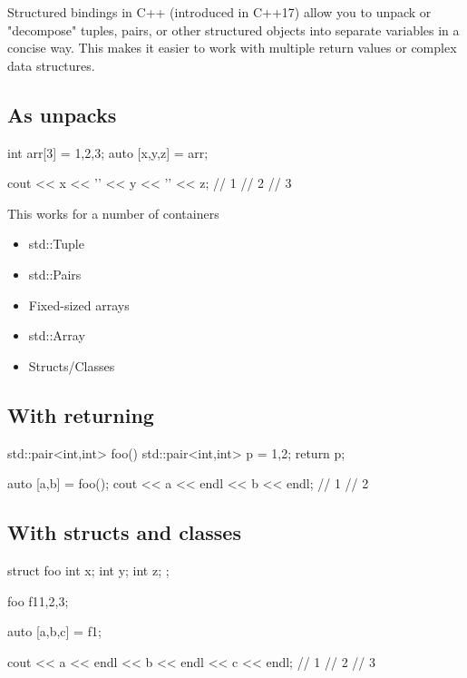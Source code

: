 \documentclass{report}
\begin{document}
    \pagebreak 
    \bigbreak \noindent 
    Structured bindings in C++ (introduced in C++17) allow you to unpack or "decompose" tuples, pairs, or other structured objects into separate variables in a concise way. This makes it easier to work with multiple return values or complex data structures.
    \bigbreak \noindent 
    \subsection{As unpacks}
    \bigbreak \noindent 
    \begin{cppcode}
        int arr[3] = {1,2,3};
        auto [x,y,z] = arr;

        cout << x << '\n' << y << '\n' << z;
        // 1
        // 2 
        // 3
    \end{cppcode}
    \bigbreak \noindent 
    This works for a number of containers
    \begin{itemize}
        \item std::Tuple
        \item std::Pairs
        \item Fixed-sized arrays
        \item std::Array
        \item Structs/Classes
    \end{itemize}

    \bigbreak \noindent 
    \subsection{With returning}
    \bigbreak \noindent 
    \begin{cppcode}
        std::pair<int,int> foo() {
            std::pair<int,int> p = {1,2};
            return p;
        }

        auto [a,b] = foo();
        cout << a << endl << b << endl;
        // 1
        // 2
    \end{cppcode}

    \pagebreak \bigbreak \noindent 
    \subsection{With structs and classes}
    \bigbreak \noindent 
    \begin{cppcode}
        struct foo {
            int x;
            int y;
            int z;
        };

        foo f1{1,2,3};

        auto [a,b,c] = f1;

        cout << a << endl << b << endl << c << endl;
        // 1
        // 2
        // 3
    \end{cppcode}
\end{document}
